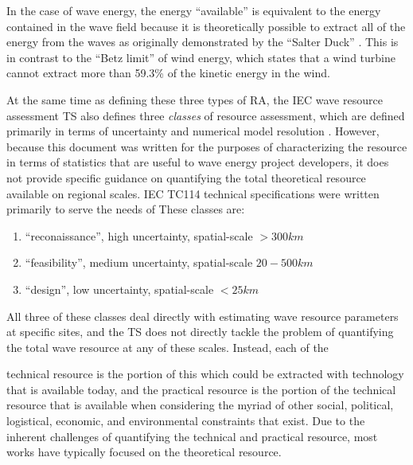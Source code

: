 In the case of wave energy, the energy ``available'' is equivalent to the energy contained in the wave field because it is theoretically possible to extract all of the energy from the waves as originally demonstrated by the ``Salter Duck'' \citep{salterRecentProgressDucks1980}. This is in contrast to the ``Betz limit'' of wind energy, which states that a wind turbine cannot extract more than 59.3\% of the kinetic energy in the wind. 

At the same time as defining these three types of RA, the IEC wave resource assessment TS also defines three {\em classes} of resource assessment, which are defined primarily in terms of uncertainty and numerical model resolution \citep{internationalelectrotechnicalcommissionPart101Wave2015}. However, because this document was written for the purposes of characterizing the resource in terms of statistics that are useful to wave energy project developers, it does not provide specific guidance on quantifying the total theoretical resource available on regional scales. 
IEC TC114 technical specifications were written primarily to serve the needs of  These classes are:
\begin{enumerate}
\item ``reconaissance'', high uncertainty, spatial-scale $>300 km$
\item ``feasibility'', medium uncertainty, spatial-scale $20- 500 km$
\item ``design'', low uncertainty, spatial-scale $<25 km$
\end{enumerate}
All three of these classes deal directly with estimating wave resource parameters at specific sites, and the TS does not directly tackle the problem of quantifying the total wave resource at any of these scales. Instead, each of the 

  
technical resource is the portion of this which could be extracted with
technology that is available today, and the practical resource is the portion
of the technical resource that is available when considering the myriad of other social, political, logistical,
economic, and environmental constraints that exist. Due to the inherent challenges of
quantifying the technical and practical resource, most works have typically
focused on the theoretical resource.


